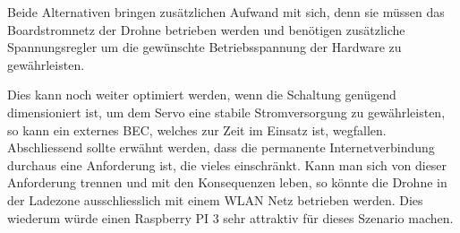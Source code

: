 Beide Alternativen bringen zusätzlichen Aufwand mit sich, denn sie müssen das Boardstromnetz der Drohne betrieben werden und benötigen zusätzliche Spannungsregler um die gewünschte Betriebsspannung der Hardware zu gewährleisten. 

Dies kann noch weiter optimiert werden, wenn die Schaltung genügend dimensioniert ist, um dem Servo eine stabile Stromversorgung zu gewährleisten, so kann ein externes BEC, welches zur Zeit im Einsatz ist, wegfallen.\\

Abschliessend sollte erwähnt werden, dass die permanente Internetverbindung durchaus eine Anforderung ist, die vieles einschränkt.
Kann man sich von dieser Anforderung trennen und mit den Konsequenzen leben, so könnte die Drohne in der Ladezone ausschliesslich mit einem WLAN Netz betrieben werden. Dies wiederum würde einen Raspberry PI 3 sehr attraktiv für dieses Szenario machen.
\newpage
